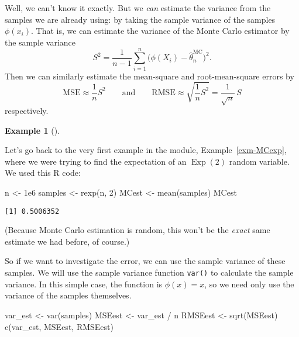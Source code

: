 \documentclass[
  letterpaper,
  DIV=11,
  numbers=noendperiod]{scrreprt}
\newenvironment{Shaded}{\begin{snugshade}}{\end{snugshade}}
\newcommand{\DecValTok}[1]{\textcolor[rgb]{0.68,0.00,0.00}{#1}}
\newcommand{\FloatTok}[1]{\textcolor[rgb]{0.68,0.00,0.00}{#1}}
\newcommand{\FunctionTok}[1]{\textcolor[rgb]{0.28,0.35,0.67}{#1}}
\newcommand{\NormalTok}[1]{\textcolor[rgb]{0.00,0.23,0.31}{#1}}
\newcommand{\OtherTok}[1]{\textcolor[rgb]{0.00,0.23,0.31}{#1}}
\newcommand{\SpecialCharTok}[1]{\textcolor[rgb]{0.37,0.37,0.37}{#1}}
\theoremstyle{plain}
\theoremstyle{definition}
\theoremstyle{definition}
\newtheorem{example}{Example}[chapter]
\theoremstyle{remark}
\begin{document}
Well, we can't know it exactly. But we \emph{can} estimate the variance
from the samples we are already using: by taking the sample variance of
the samples \(\phi(x_i)\). That is, we can estimate the variance of the
Monte Carlo estimator by the sample variance
\[ S^2 = \frac{1}{n-1} \sum_{i=1}^n \big(\phi(X_i) - \widehat{\theta}_n^{\mathrm{MC}} \big)^2 . \]
Then we can similarly estimate the mean-square and root-mean-square
errors by
\[ \text{MSE} \approx \frac{1}{n}S^2 \qquad \text{and} \qquad \text{RMSE} \approx \sqrt{\frac{1}{n} S^2} = \frac{1}{\sqrt{n}}\,S  \]
respectively.

\begin{example}[]\protect\hypertarget{exm-MCexp2}{}\label{exm-MCexp2}

Let's go back to the very first example in the module,
Example~\ref{exm-MCexp}, where we were trying to find the expectation of
an \(\operatorname{Exp}(2)\) random variable. We used this R code:

\begin{Shaded}
\begin{Highlighting}[]
\NormalTok{n }\OtherTok{\textless{}{-}} \FloatTok{1e6}
\NormalTok{samples }\OtherTok{\textless{}{-}} \FunctionTok{rexp}\NormalTok{(n, }\DecValTok{2}\NormalTok{)}
\NormalTok{MCest }\OtherTok{\textless{}{-}} \FunctionTok{mean}\NormalTok{(samples)}
\NormalTok{MCest}
\end{Highlighting}
\end{Shaded}

\begin{verbatim}
[1] 0.5006352
\end{verbatim}

(Because Monte Carlo estimation is random, this won't be the
\emph{exact} same estimate we had before, of course.)

So if we want to investigate the error, we can use the sample variance
of these samples. We will use the sample variance function
\texttt{var()} to calculate the sample variance. In this simple case,
the function is \(\phi(x) = x\), so we need only use the variance of the
samples themselves.

\begin{Shaded}
\begin{Highlighting}[]
\NormalTok{var\_est }\OtherTok{\textless{}{-}} \FunctionTok{var}\NormalTok{(samples)}
\NormalTok{MSEest  }\OtherTok{\textless{}{-}}\NormalTok{ var\_est }\SpecialCharTok{/}\NormalTok{ n}
\NormalTok{RMSEest }\OtherTok{\textless{}{-}} \FunctionTok{sqrt}\NormalTok{(MSEest)}
\FunctionTok{c}\NormalTok{(var\_est, MSEest, RMSEest)}
\end{Highlighting}
\end{Shaded}


\end{example}
\end{document}
